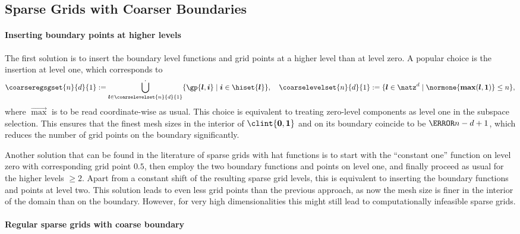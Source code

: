 \subsection{Sparse Grids with Coarser Boundaries}
\label{sec:241coarseBoundary}

\paragraph{Inserting boundary points at higher levels}

The first solution is to insert the boundary level functions and grid points
at a higher level than at level zero.
A popular choice is the insertion at level one, which corresponds to
\begin{equation}
  \label{eq:sparseGridB1}
  \coarseregsgset{n}{d}{1}
  := \bigdotcup_{\*l \in \coarselevelset{n}{d}{1}}
  \{\gp{\*l,\*i} \mid \*i \in \hiset{\*l}\},\quad
  \coarselevelset{n}{d}{1}
  := \{\*l \in \natz^d \mid \normone{\vecmax(\*l, \*1)} \le n\},
\end{equation}
where $\vec{\max}$ is to be read coordinate-wise as usual.
This choice is equivalent to treating zero-level components as level one
in the subspace selection.
This ensures that the finest mesh sizes in the interior of
$\clint{\*0, \*1}$ and on its boundary coincide to be $\ms{n-d+1}$,
which reduces the number of grid points on the boundary significantly.

Another solution that can be found in the literature of sparse grids with
hat functions \cite{Baar15Gradient}
is to start with the ``constant one'' function on level zero with
corresponding grid point $0.5$,
then employ the two boundary functions and points on level one,
and finally proceed as usual for the higher levels $\ge 2$.
Apart from a constant shift of the resulting sparse grid levels,
this is equivalent to inserting the boundary functions and points at level two.
This solution leads to even less grid points than the previous approach,
as now the mesh size is finer in the interior of the domain than on the
boundary.
However, for very high dimensionalities this might still lead to
computationally infeasible sparse grids.

\paragraph{Regular sparse grids with coarse boundary}

